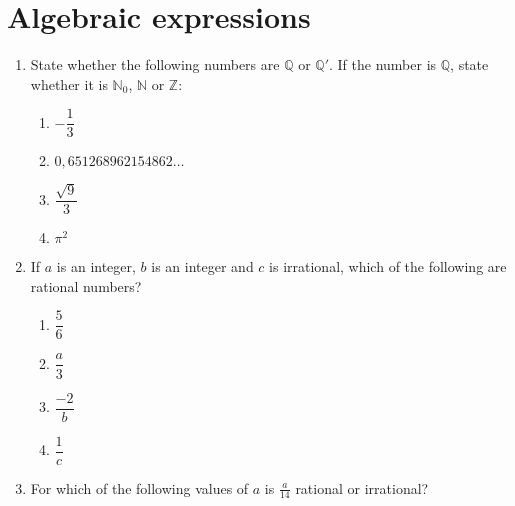 \chapter{Algebraic expressions}
\begin{exercises}{}{
\begin{enumerate}[itemsep=5pt, label=\textbf{\arabic*}. ] 
 \item State whether the following numbers are $\mathbb{Q}$ or $\mathbb{Q'}$. If the number is $\mathbb{Q}$, state whether it is $\mathbb{N}_0$, $\mathbb{N}$ or $\mathbb{Z}$:
\begin{enumerate}[itemsep=5pt, label=\textbf{(\alph*)} ] 
    \item $-\dfrac{1}{3}$
    \item $0,651268962154862\ldots$
    \item $\dfrac{\sqrt{9}}{3}$
    \item $\pi^2$
\end{enumerate}


\item If $a$ is an integer, $b$ is an integer and $c$ is irrational, which of the following are rational numbers? 
  \begin{enumerate}[itemsep=5pt, label=\textbf{(\alph*)} ] 
    \item $\dfrac{5}{6}$
    \item $\dfrac{a}{3}$
    \item $\dfrac{-2}{b}$
    \item $\dfrac{1}{c}$
    \end{enumerate}
\item For which of the following values of $a$ is $\frac{a}{14}$ rational or irrational?


\end{enumerate}}
\end{exercises}
